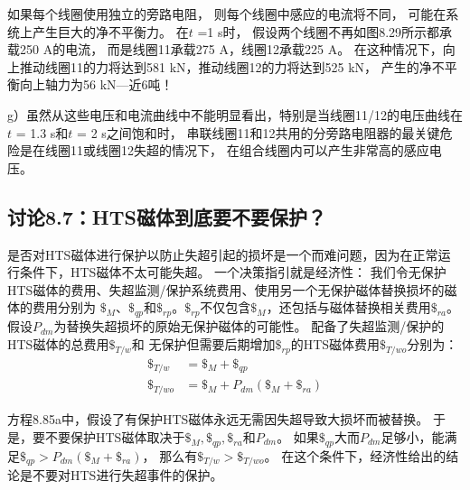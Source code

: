 如果每个线圈使用独立的旁路电阻，
则每个线圈中感应的电流将不同，
可能在系统上产生巨大的净不平衡力。
在$t$ =1 s时，
假设两个线圈不再如图8.29所示都承载250 A的电流，
而是线圈11承载275 A，线圈12承载225 A。
在这种情况下，向上推动线圈11的力将达到581 kN，推动线圈12的力将达到525 kN，
产生的净不平衡向上轴力为56 kN---近6吨！

g）虽然从这些电压和电流曲线中不能明显看出，特别是当线圈11/12的电压曲线在$t$ = 1.3 s和$t$ = 2 s之间饱和时，
串联线圈11和12共用的分旁路电阻器的最关键危险是在线圈11或线圈12失超的情况下，
在组合线圈内可以产生非常高的感应电压。

\subsection{讨论8.7：HTS磁体到底要不要保护？}
是否对HTS磁体进行保护以防止失超引起的损坏是一个而难问题，因为在正常运行条件下，HTS磁体不太可能失超。
一个决策指引就是经济性：
我们令无保护HTS磁体的费用、失超监测/保护系统费用、使用另一个无保护磁体替换损坏的磁体的费用分别为
$\$_M$、$\$_{qp}$和$\$_{rp}$。$\$_{rp}$不仅包含$\$_M$，还包括与磁体替换相关费用$\$_{ra}$。
假设$P_{dm}$为替换失超损坏的原始无保护磁体的可能性。
配备了失超监测/保护的HTS磁体的总费用$\$_{T/w}$和
无保护但需要后期增加$\$_{rp}$的HTS磁体费用$\$_{T/wo}$分别为：
\begin{subequations}
	\begin{align}
\$_{T/w}&=\$_M+\$_{qp}\\
\$_{T/wo}&=\$_M+P_{dm}(\$_M+\$_{ra})
	\end{align}
\end{subequations}

方程8.85a中，假设了有保护HTS磁体永远无需因失超导致大损坏而被替换。
于是，要不要保护HTS磁体取决于$\$_M,\$_{qp},\$_{ra}$和$P_{dm}$。
如果$\$_{qp}$大而$P_{dm}$足够小，能满足$\$_{qp}>P_{dm}(\$_M+\$_{ra})$，
那么有$\$_{T/w}>\$_{T/wo}$。
在这个条件下，经济性给出的结论是不要对HTS进行失超事件的保护。
